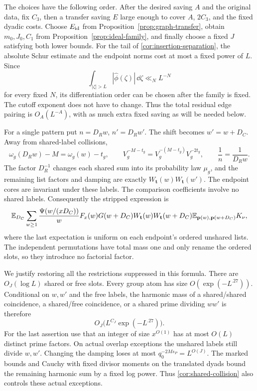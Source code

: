 The choices have the following order.  After the desired saving $A$
and the original data, fix $C_3$, then a transfer saving $E$ large
enough to cover $A$, $2C_3$, and the fixed dyadic costs.  Choose
$E_{\rm id}$ from Proposition~\ref{prop:graph-transfer}, obtain
$m_0,J_0,C_1$ from Proposition~\ref{prop:ideal-family}, and finally
choose a fixed $J$ satisfying both lower bounds.  For the tail of
\eqref{cor:insertion-separation}, the absolute Schur estimate and
the endpoint norms cost at most a fixed power of $L$.  Since
\[
 \int_{|\zeta|>L}|\widehat\phi(\zeta)|\,\dd\zeta
       \ll_N L^{-N}
\]
for every fixed $N$, its differentiation order can be chosen after
the family is fixed.  The cutoff exponent does not have to change.
Thus the total residual edge pairing is $O_A(L^{-A})$, with as much
extra fixed saving as will be needed below.

For a single pattern put $n=D_Rw$, $n'=D_Rw'$.  The shift becomes
$w'=w+D_C$.  Away from shared-label collisions,
\begin{equation}\label{cor:stripping-normalization}
 \omega_g(D_Rw)-M=\omega_g(w)-t_g,
 \qquad
 V_g^{-M-t_g}=V_g^{-(M-t_g)}V_g^{-2t_g},
 \qquad \frac1n=\frac1{D_Rw}.
\end{equation}
The factor $D_R^{-1}$ changes each shared sum into its probability
law $\mu_g$, and the remaining list factors and damping are exactly
$W_{\mathbf t}(w)W_{\mathbf t}(w')$.  The endpoint cores are invariant
under these labels.  The comparison coefficients involve no shared
labels.  Consequently the stripped expression is
\begin{equation}\label{cor:stripped}
 \mathbb E_{D_C}\sum_{w\geq1}\frac{\Psi(w/(xD_C))}{w}
       F_x(w)G(w+D_C)
       W_{\mathbf t}(w)W_{\mathbf t}(w+D_C)
       \mathbb E_{\mathbf p(w),\mathbf p(w+D_C)}K_\nu,
\end{equation}
where the last expectation is uniform on each endpoint's ordered
unshared lists.  The independent permutations have total mass one and
only rename the ordered slots, so they introduce no factorial factor.

We justify restoring all the restrictions suppressed in this formula.
There are $O_J(\log L)$ shared or free slots.  Every group atom
has size $O(\exp(-L^{.27}))$.  Conditional on $w,w'$ and the free
labels, the harmonic mass of a shared/shared coincidence, a
shared/free coincidence, or a shared prime dividing $ww'$ is therefore
\begin{equation}\label{cor:shared-collision}
 O_J\bigl(L^{C_J}\exp(-L^{.27})\bigr).
\end{equation}
For the last assertion use that an integer of size $x^{O(1)}$ has at
most $O(L)$ distinct prime factors.  On actual overlap exceptions the
unshared labels still divide $w,w'$.  Changing the damping loses at
most $q_0^{-2Ms_P}=L^{O(J)}$.  The marked bounds and Cauchy with
fixed divisor moments on the translated dyads bound the remaining
harmonic sum by a fixed log power.  Thus
\eqref{cor:shared-collision} also controls these actual exceptions.

